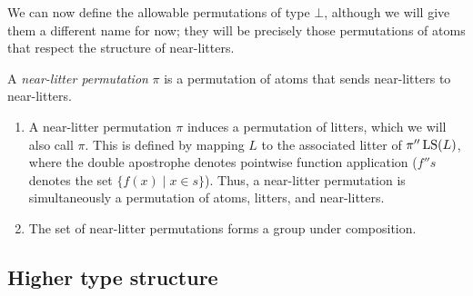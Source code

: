 We can now define the allowable permutations of type \( \bot \), although we will give them a different name for now; they will be precisely those permutations of atoms that respect the structure of near-litters.
\begin{definition}
    A \emph{near-litter permutation} \( \pi \) is a permutation of atoms that sends near-litters to near-litters.
\end{definition}
\begin{remarks}
    \begin{enumerate}
        \item A near-litter permutation \( \pi \) induces a permutation of litters, which we will also call \( \pi \).
        This is defined by mapping \( L \) to the associated litter of \( \pi '' \operatorname{LS}(L) \), where the double apostrophe denotes pointwise function application (\( f '' s \) denotes the set \( \{ f(x) \mid x \in s \} \)).
        Thus, a near-litter permutation is simultaneously a permutation of atoms, litters, and near-litters.
        \item The set of near-litter permutations forms a group under composition.
    \end{enumerate}
\end{remarks}

\subsection{Higher type structure}

